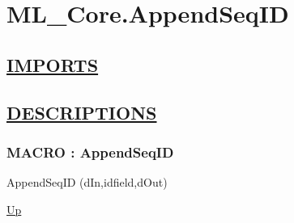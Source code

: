 \chapter*{ML\_Core.AppendSeqID}
\hypertarget{ecldoc:toc:ML_Core.AppendSeqID}{}

\section*{\underline{IMPORTS}}

\section*{\underline{DESCRIPTIONS}}
\subsection*{MACRO : AppendSeqID}
\hypertarget{ecldoc:ml_core.appendseqid}{}
\begin{minipage}[t]{\textwidth}
\begin{flushleft}
 AppendSeqID (dIn,idfield,dOut)
\end{flushleft}
\end{minipage}
\hyperlink{ecldoc:toc:ML_Core}{Up}

\par
\par
